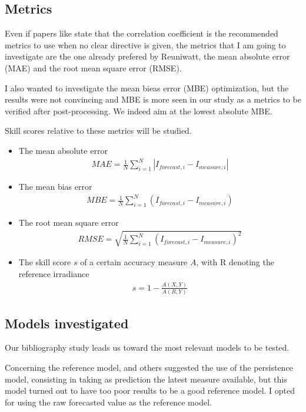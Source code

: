 \subsection{Metrics}
Even if papers like \cite{mayer_calibration_2023} state that the correlation coefficient is the recommended metrics to use when no clear directive is given, the metrics 
that I am going to investigate are the one already prefered by Reuniwatt, the mean absolute error (MAE) and the root mean square error (RMSE). 

I also wanted to investigate the mean bieas error (MBE) optimization, but the results were not convincing and MBE is more seen in our study as a metrics to be verified after post-processing.
We indeed aim at the lowest absolute MBE.

Skill scores relative to these metrics will be studied.
\begin{itemize}
    \item The mean absolute error \begin{align*}
        MAE = \frac{1}{N} \sum_{i=1}^{N} | I_{forecast, i} - I_{measure, i} |
    \end{align*}

    \item The mean bias error \begin{align*}
        MBE = \frac{1}{N} \sum_{i=1}^{N} ( I_{forecast, i} - I_{measure, i} )
    \end{align*}

    \item The root mean square error \begin{align*}
        RMSE = \sqrt{\frac{1}{N} \sum_{i=1}^{N} ( I_{forecast, i} - I_{measure, i} ) ^{2}}
    \end{align*}

    \item The skill score $s$  of a certain accuracy measure $A$, with R denoting the reference irradiance
    \begin{align*}
        s = 1 - \frac{A(X,Y)}{A(R,Y)}
    \end{align*}
\end{itemize}

\subsection{Models investigated}\label{subsec:models}
Our bibliography study leads us toward the most relevant models to be tested.

Concerning the reference model, \cite{lorenz_benchmarking_nodate} and others suggested the use of the persistence model, consisting in taking as prediction the latest measure available,
but this model turned out to have too poor results to be a good reference model. I opted for using the raw forecasted value as the reference model.\\

